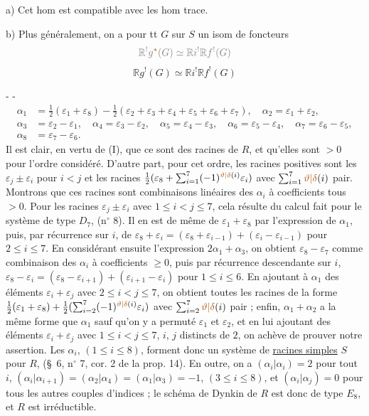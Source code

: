 a) Cet hom est compatible avec les hom trace.

b) Plus généralement, on a pour tt $G$ sur $S$ un isom de foncteurs
\[
\deleted{\mathbb{R}^!g^{\unsure{*}}(G)\simeq \mathbb{R}i^!\mathbb{R}f^!(G)}
\]
\[
\mathbb{R}g^!(G)\simeq \mathbb{R}i^!\mathbb{R}f^!(G)
\]

-  -
\[
\begin{aligned}
\alpha_1&=\tfrac12(\varepsilon_1+\varepsilon_8)-\tfrac12(\varepsilon_2+\varepsilon_3+\varepsilon_4+\varepsilon_5+\varepsilon_6+\varepsilon_7),\quad
\alpha_2=\varepsilon_1+\varepsilon_2,\\
\alpha_3&=\varepsilon_2-\varepsilon_1,\quad
\alpha_4=\varepsilon_3-\varepsilon_2,\quad
\alpha_5=\varepsilon_4-\varepsilon_3,\quad
\alpha_6=\varepsilon_5-\varepsilon_4,\quad
\alpha_7=\varepsilon_6-\varepsilon_5,\\
\alpha_8&=\varepsilon_7-\varepsilon_6.
\end{aligned}
\]
Il est clair, en vertu de (I), que ce sont des racines de $R$, et qu'elles sont $>0$ pour l'ordre considéré. D'autre part, pour cet ordre, les racines positives sont les $\varepsilon_j\pm\varepsilon_i$ pour $i<j$ et les racines $\tfrac12(\varepsilon_8+\sum_{i=1}^7(-1)^{\unsure{\vartheta|\delta}(i)}\varepsilon_i)$ avec $\sum_{i=1}^7\unsure{\vartheta|\delta}(i)$ pair. Montrons que ces racines sont combinaisons linéaires des $\alpha_i$ à coefficients tous $>0$. Pour les racines $\varepsilon_j\pm\varepsilon_i$ avec $1\leq i<j\leq7$, cela résulte du calcul fait pour le système de type $D_7$, (n$^\circ$ 8). Il en est de même de $\varepsilon_1+\varepsilon_8$ par l'expression de $\alpha_1$, puis, par récurrence sur $i$, de $\varepsilon_8+\varepsilon_i=(\varepsilon_8+\varepsilon_{i-1})+(\varepsilon_i-\varepsilon_{i-1})$ pour $2\leq i\leq7$. En considérant ensuite l'expression $2\alpha_1+\alpha_3$, on obtient $\varepsilon_8-\varepsilon_7$ comme combinaison des $\alpha_i$ à coefficients $\geq0$, puis par récurrence descendante sur $i$, $\varepsilon_8-\varepsilon_i=(\varepsilon_8-\varepsilon_{i+1})+(\varepsilon_{i+1}-\varepsilon_i)$ pour $1\leq i\leq6$. En ajoutant à $\alpha_1$ des éléments $\varepsilon_i+\varepsilon_j$ avec $2\leq i<j\leq7$, on obtient toutes les racines de la forme $\tfrac12(\varepsilon_1+\varepsilon_8)+\tfrac12(\sum_{i=2}^7(-1)^{\unsure{\vartheta|\delta}(i)}\varepsilon_i)$ avec $\sum_{i=2}^7\unsure{\vartheta|\delta}(i)$ pair ; enfin, $\alpha_1+\alpha_2$ a la même forme que $\alpha_1$ sauf qu'on y a permuté $\varepsilon_1$ et $\varepsilon_2$, et en lui ajoutant des éléments $\varepsilon_i+\varepsilon_j$ avec $1\leq i<j\leq7$, $i$, $j$ distincts de $2$, on achève de prouver notre assertion. Les $\alpha_i$, $(1\leq i\leq8)$, forment donc un système de \uline{racines simples} $S$ pour $R$, (\S\ 6, n$^\circ$ 7, cor. 2 de la prop. 14). En outre, on a $(\alpha_i|\alpha_i)=2$ pour tout $i$, $(\alpha_i|\alpha_{i+1})=(\alpha_2|\alpha_4)=(\alpha_1|\alpha_3)=-1$, $(3\leq i\leq8)$, et $(\alpha_i|\alpha_j)=0$ pour tous les autres couples d'indices ; le schéma de Dynkin de $R$ est donc de type $E_8$, et $R$ est irréductible.

